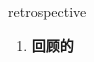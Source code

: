 
\begin{frame}
{\huge retrospective}
\begin{center}
\begin{enumerate}\Large
  \item \textbf{回顾的}
\end{enumerate}
\end{center}
\end{frame}
